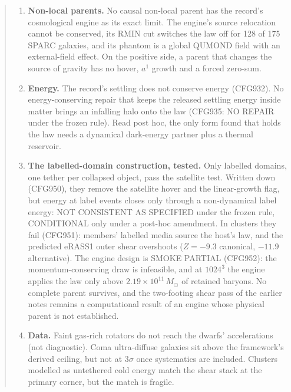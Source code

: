 \documentclass[10pt]{article}
\begin{document}
\begin{abstract}
\begin{enumerate}
\item \textbf{Non-local parents.} No causal non-local parent has the record's cosmological engine as its exact limit. The engine's source relocation cannot be conserved, its RMIN cut switches the law off for 128 of 175 SPARC galaxies, and its phantom is a global QUMOND field with an external-field effect. On the positive side, a parent that changes the source of gravity has no hover, $a^1$ growth and a forced zero-sum.
\item \textbf{Energy.} The record's settling does not conserve energy (CFG932). No energy-conserving repair that keeps the released settling energy inside matter brings an infalling halo onto the law (CFG935: NO REPAIR under the frozen rule). Read post hoc, the only form found that holds the law needs a dynamical dark-energy partner plus a thermal reservoir.
\item \textbf{The labelled-domain construction, tested.} Only labelled domains, one tether per collapsed object, pass the satellite test. Written down (CFG950), they remove the satellite hover and the linear-growth flag, but energy at label events closes only through a non-dynamical label energy: NOT CONSISTENT AS SPECIFIED under the frozen rule, CONDITIONAL only under a post-hoc amendment. In clusters they fail (CFG951): members' labelled media source the host's law, and the predicted eRASS1 outer shear overshoots ($Z=-9.3$ canonical, $-11.9$ alternative). The engine design is SMOKE PARTIAL (CFG952): the momentum-conserving draw is infeasible, and at $1024^3$ the engine applies the law only above $2.19\times10^{11}\,M_\odot$ of retained baryons. No complete parent survives, and the two-footing shear pass of the earlier notes remains a computational result of an engine whose physical parent is not established.
\item \textbf{Data.} Faint gas-rich rotators do not reach the dwarfs' accelerations (not diagnostic). Coma ultra-diffuse galaxies sit above the framework's derived ceiling, but not at $3\sigma$ once systematics are included. Clusters modelled as untethered cold energy match the shear stack at the primary corner, but the match is fragile.
\end{enumerate}
\end{abstract}
\end{document}
